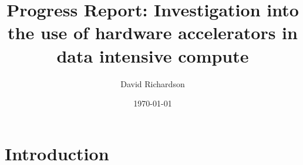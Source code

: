\documentclass[12pt,a4paper]{report}
\title{Progress Report: Investigation into the use of hardware accelerators in data intensive compute}
\author{David Richardson}
\date{\today}
\begin{document}
	\maketitle

	\section{Introduction} %
	\label{sec:introduction}
	


	\printbibliography

	
\end{document}
